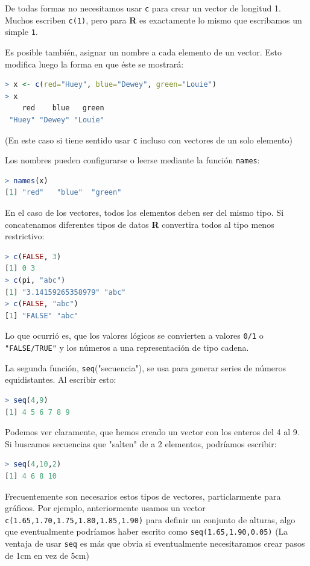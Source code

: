 De todas formas no necesitamos usar \texttt{c} para crear un vector de longitud
1. Muchos escriben \texttt{c(1)}, pero para \textbf{R} es exactamente lo mismo
que escribamos un simple \texttt{1}.

Es posible también, asignar un nombre a cada elemento de un vector. Esto
modifica luego la forma en que éste se mostrará:

\begin{lstlisting}[language=R]
> x <- c(red="Huey", blue="Dewey", green="Louie")
> x
    red    blue   green
 "Huey" "Dewey" "Louie"
\end{lstlisting}

(En este caso si tiene sentido usar \texttt{c} incluso con vectores de un solo
elemento)

Los nombres pueden configurarse o leerse mediante la función \texttt{names}:

\begin{lstlisting}[language=R]
> names(x)
[1] "red"   "blue"  "green"
\end{lstlisting}

En el caso de los vectores, todos los elementos deben ser del mismo tipo. Si
concatenamos diferentes tipos de datos \textbf{R} convertira todos al tipo menos
restrictivo:

\begin{lstlisting}[language=R]
> c(FALSE, 3)
[1] 0 3
> c(pi, "abc")
[1] "3.14159265358979" "abc"
> c(FALSE, "abc")
[1] "FALSE" "abc"
\end{lstlisting}

Lo que ocurrió es, que los valores lógicos se convierten a valores \texttt{0/1}
o \texttt{"FALSE/TRUE"} y los números a una representación de tipo cadena.

La segunda función, \texttt{seq}("secuencia"), se usa para generar series de
números equidistantes. Al escribir esto:

\begin{lstlisting}[language=R]
> seq(4,9)
[1] 4 5 6 7 8 9
\end{lstlisting}

Podemos ver claramente, que hemos creado un vector con los enteros del 4 al 9.
Si buscamos secuencias que "salten" de a 2 elementos, podríamos escribir:

\begin{lstlisting}[language=R]
> seq(4,10,2)
[1] 4 6 8 10
\end{lstlisting}

Frecuentemente son necesarios estos tipos de vectores, particlarmente para
gráficos. Por ejemplo, anteriormente usamos un vector
\texttt{c(1.65,1.70,1.75,1.80,1.85,1.90)} para definir un conjunto de alturas,
algo que eventualmente podríamos haber escrito como
\texttt{seq(1.65,1.90,0.05)} (La ventaja de usar \texttt{seq} es más que obvia
si eventualmente necesitaramos crear pasos de 1cm en vez de 5cm)

